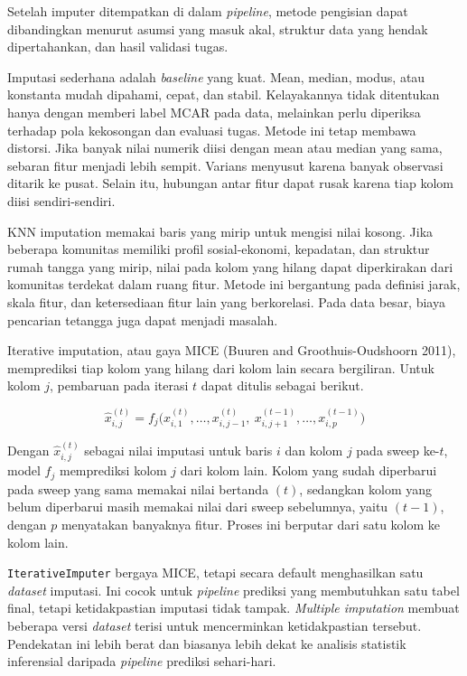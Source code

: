 Setelah imputer ditempatkan di dalam \emph{pipeline}, metode pengisian dapat dibandingkan menurut asumsi yang masuk akal, struktur data yang hendak dipertahankan, dan hasil validasi tugas.

Imputasi sederhana adalah \emph{baseline} yang kuat. Mean, median, modus, atau konstanta mudah dipahami, cepat, dan stabil. Kelayakannya tidak ditentukan hanya dengan memberi label MCAR pada data, melainkan perlu diperiksa terhadap pola kekosongan dan evaluasi tugas. Metode ini tetap membawa distorsi. Jika banyak nilai numerik diisi dengan mean atau median yang sama, sebaran fitur menjadi lebih sempit. Varians menyusut karena banyak observasi ditarik ke pusat. Selain itu, hubungan antar fitur dapat rusak karena tiap kolom diisi sendiri-sendiri.

KNN imputation memakai baris yang mirip untuk mengisi nilai kosong. Jika beberapa komunitas memiliki profil sosial-ekonomi, kepadatan, dan struktur rumah tangga yang mirip, nilai pada kolom yang hilang dapat diperkirakan dari komunitas terdekat dalam ruang fitur. Metode ini bergantung pada definisi jarak, skala fitur, dan ketersediaan fitur lain yang berkorelasi. Pada data besar, biaya pencarian tetangga juga dapat menjadi masalah.

Iterative imputation, atau gaya MICE (Buuren and Groothuis-Oudshoorn 2011), memprediksi tiap kolom yang hilang dari kolom lain secara bergiliran. Untuk kolom \(j\), pembaruan pada iterasi \(t\) dapat ditulis sebagai berikut.

\[
\hat{x}_{i,j}^{(t)} = f_j\big(x_{i,1}^{(t)}, \dots, x_{i,j-1}^{(t)},\ x_{i,j+1}^{(t-1)}, \dots, x_{i,p}^{(t-1)}\big)
\]

Dengan \(\hat{x}_{i,j}^{(t)}\) sebagai nilai imputasi untuk baris \(i\) dan kolom \(j\) pada sweep ke-\(t\), model \(f_j\) memprediksi kolom \(j\) dari kolom lain. Kolom yang sudah diperbarui pada sweep yang sama memakai nilai bertanda \((t)\), sedangkan kolom yang belum diperbarui masih memakai nilai dari sweep sebelumnya, yaitu \((t-1)\), dengan \(p\) menyatakan banyaknya fitur. Proses ini berputar dari satu kolom ke kolom lain.

\passthrough{\lstinline!IterativeImputer!} bergaya MICE, tetapi secara default menghasilkan satu \emph{dataset} imputasi. Ini cocok untuk \emph{pipeline} prediksi yang membutuhkan satu tabel final, tetapi ketidakpastian imputasi tidak tampak. \emph{Multiple imputation} membuat beberapa versi \emph{dataset} terisi untuk mencerminkan ketidakpastian tersebut. Pendekatan ini lebih berat dan biasanya lebih dekat ke analisis statistik inferensial daripada \emph{pipeline} prediksi sehari-hari.

